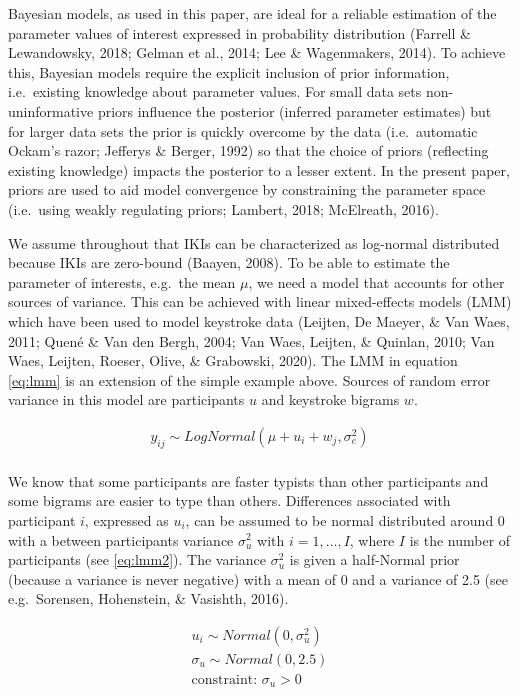 \documentclass[
  english,
  man,mask,floatsintext]{apa7}
\begin{document}
Bayesian models, as used in this paper, are ideal for a reliable estimation of the parameter values of interest expressed in probability distribution (Farrell \& Lewandowsky, 2018; Gelman et al., 2014; Lee \& Wagenmakers, 2014). To achieve this, Bayesian models require the explicit inclusion of prior information, i.e.~existing knowledge about parameter values. For small data sets non-uninformative priors influence the posterior (inferred parameter estimates) but for larger data sets the prior is quickly overcome by the data (i.e.~automatic Ockam's razor; Jefferys \& Berger, 1992) so that the choice of priors (reflecting existing knowledge) impacts the posterior to a lesser extent. In the present paper, priors are used to aid model convergence by constraining the parameter space (i.e.~using weakly regulating priors; Lambert, 2018; McElreath, 2016).

We assume throughout that IKIs can be characterized as log-normal distributed because IKIs are zero-bound (Baayen, 2008). To be able to estimate the parameter of interests, e.g.~the mean \(\mu\), we need a model that accounts for other sources of variance. This can be achieved with linear mixed-effects models (LMM) which have been used to model keystroke data (Leijten, De Maeyer, \& Van Waes, 2011; Quené \& Van den Bergh, 2004; Van Waes, Leijten, \& Quinlan, 2010; Van Waes, Leijten, Roeser, Olive, \& Grabowski, 2020). The LMM in equation \ref{eq:lmm} is an extension of the simple example above. Sources of random error variance in this model are participants \(u\) and keystroke bigrams \(w\).

\[
\tag{1}
\begin{aligned}
y_{ij} \sim LogNormal(\mu + u_i + w_j, \sigma_e^2)\\
\end{aligned}
\label{eq:lmm}
\]

We know that some participants are faster typists than other participants and some bigrams are easier to type than others. Differences associated with participant \(i\), expressed as \(u_i\), can be assumed to be normal distributed around 0 with a between participants variance \(\sigma_u^2\) with \(i = 1, \dots, I\), where \(I\) is the number of participants (see \ref{eq:lmm2}). The variance \(\sigma_u^2\) is given a half-Normal prior (because a variance is never negative) with a mean of 0 and a variance of 2.5 (see e.g.~Sorensen, Hohenstein, \& Vasishth, 2016).

\[
\tag{2}
\begin{aligned}
u_i \sim Normal(0,\sigma_u^2)\\
\sigma_u \sim Normal(0,2.5)\\
\text{constraint: } \sigma_u >0 
\end{aligned}
\label{eq:lmm2}
\]
\end{document}
